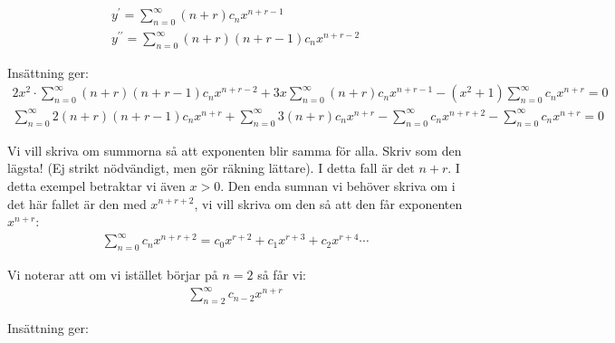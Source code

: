 \begin{equation*}
  \begin{gathered}
    y^{\prime} = \sum_{n=0}^{\infty}(n+r)c_nx^{n+r-1}\\
    y^{\prime\prime}=\sum_{n=0}^{\infty}(n+r)(n+r-1)c_nx^{n+r-2}
  \end{gathered}
\end{equation*}\par
\noindent Insättning ger:
\begin{equation*}
  \begin{gathered}
    2x^2\cdot\sum_{n=0}^{\infty}(n+r)(n+r-1)c_nx^{n+r-2}+3x\sum_{n=0}^{\infty}(n+r)c_nx^{n+r-1}-(x^2+1)\sum_{n=0}^{\infty}c_nx^{n+r}=0\\
    \sum_{n=0}^{\infty}2(n+r)(n+r-1)c_nx^{n+r}+\sum_{n=0}^{\infty}3(n+r)c_nx^{n+r}-\sum_{n=0}^{\infty}c_nx^{n+r+2}-\sum_{n=0}^{\infty}c_nx^{n+r}=0
  \end{gathered}
\end{equation*}\par
\noindent Vi vill skriva om summorna så att exponenten blir samma för alla. Skriv som den lägsta! (Ej strikt nödvändigt, men gör räkning lättare). I detta fall är det $n+r$. I detta exempel betraktar vi även $x>0$. Den enda sumnan vi behöver skriva om i det här fallet är den med $x^{n+r+2}$, vi vill skriva om den så att den får exponenten $x^{n+r}$:
\begin{equation*}
  \begin{gathered}
    \sum_{n=0}^{\infty}c_nx^{n+r+2}=c_0x^{r+2}+c_1x^{r+3}+c_2x^{r+4}\cdots
  \end{gathered}
\end{equation*}\par
\noindent Vi noterar att om vi istället börjar på $n=2$ så får vi:
\begin{equation*}
  \begin{gathered}
    \sum_{n=2}^{\infty}c_{n-2}x^{n+r}
  \end{gathered}
\end{equation*}\par
\noindent Insättning ger:

